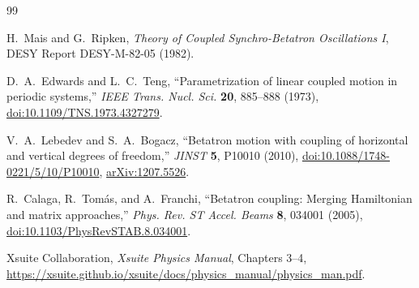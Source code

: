 \documentclass[11pt,a4paper]{article}
\begin{document}
\begin{thebibliography}{99}

H.~Mais and G.~Ripken,
\emph{Theory of Coupled Synchro-Betatron Oscillations I},
DESY Report DESY-M-82-05 (1982).

D.~A.~Edwards and L.~C.~Teng,
``Parametrization of linear coupled motion in periodic systems,''
\emph{IEEE Trans. Nucl. Sci.} \textbf{20}, 885--888 (1973),
\href{https://doi.org/10.1109/TNS.1973.4327279}{doi:10.1109/TNS.1973.4327279}.

V.~A.~Lebedev and S.~A.~Bogacz,
``Betatron motion with coupling of horizontal and vertical degrees of freedom,''
\emph{JINST} \textbf{5}, P10010 (2010),
\href{https://doi.org/10.1088/1748-0221/5/10/P10010}{doi:10.1088/1748-0221/5/10/P10010},
\href{https://arxiv.org/abs/1207.5526}{arXiv:1207.5526}.

R.~Calaga, R.~Tom\'as, and A.~Franchi,
``Betatron coupling: Merging Hamiltonian and matrix approaches,''
\emph{Phys. Rev. ST Accel. Beams} \textbf{8}, 034001 (2005),
\href{https://doi.org/10.1103/PhysRevSTAB.8.034001}{doi:10.1103/PhysRevSTAB.8.034001}.

Xsuite Collaboration,
\emph{Xsuite Physics Manual}, Chapters 3--4,
\url{https://xsuite.github.io/xsuite/docs/physics_manual/physics_man.pdf}.

\end{thebibliography}
\end{document}
